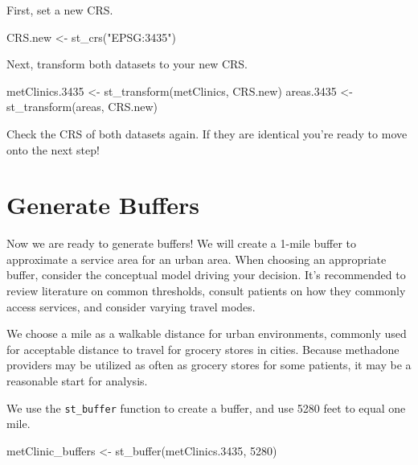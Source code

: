 \documentclass[
  letterpaper,
  DIV=11,
  numbers=noendperiod]{scrreprt}
\newenvironment{Shaded}{\begin{snugshade}}{\end{snugshade}}
\newcommand{\DecValTok}[1]{\textcolor[rgb]{0.68,0.00,0.00}{#1}}
\newcommand{\FloatTok}[1]{\textcolor[rgb]{0.68,0.00,0.00}{#1}}
\newcommand{\FunctionTok}[1]{\textcolor[rgb]{0.28,0.35,0.67}{#1}}
\newcommand{\NormalTok}[1]{\textcolor[rgb]{0.00,0.23,0.31}{#1}}
\newcommand{\OtherTok}[1]{\textcolor[rgb]{0.00,0.23,0.31}{#1}}
\newcommand{\StringTok}[1]{\textcolor[rgb]{0.13,0.47,0.30}{#1}}
\begin{document}
First, set a new CRS.

\begin{Shaded}
\begin{Highlighting}[]
\NormalTok{CRS.new }\OtherTok{\textless{}{-}} \FunctionTok{st\_crs}\NormalTok{(}\StringTok{"EPSG:3435"}\NormalTok{)}
\end{Highlighting}
\end{Shaded}

Next, transform both datasets to your new CRS.

\begin{Shaded}
\begin{Highlighting}[]
\NormalTok{metClinics}\FloatTok{.3435} \OtherTok{\textless{}{-}} \FunctionTok{st\_transform}\NormalTok{(metClinics, CRS.new)}
\NormalTok{areas}\FloatTok{.3435} \OtherTok{\textless{}{-}} \FunctionTok{st\_transform}\NormalTok{(areas, CRS.new)}
\end{Highlighting}
\end{Shaded}

Check the CRS of both datasets again. If they are identical you're ready
to move onto the next step!

\section{Generate Buffers}\label{generate-buffers}

Now we are ready to generate buffers! We will create a 1-mile buffer to
approximate a service area for an urban area. When choosing an
appropriate buffer, consider the conceptual model driving your decision.
It's recommended to review literature on common thresholds, consult
patients on how they commonly access services, and consider varying
travel modes.

We choose a mile as a walkable distance for urban environments, commonly
used for acceptable distance to travel for grocery stores in cities.
Because methadone providers may be utilized as often as grocery stores
for some patients, it may be a reasonable start for analysis.

We use the \texttt{st\_buffer} function to create a buffer, and use 5280
feet to equal one mile.

\begin{Shaded}
\begin{Highlighting}[]
\NormalTok{metClinic\_buffers }\OtherTok{\textless{}{-}} \FunctionTok{st\_buffer}\NormalTok{(metClinics}\FloatTok{.3435}\NormalTok{, }\DecValTok{5280}\NormalTok{)}
\end{Highlighting}
\end{Shaded}
\end{document}
